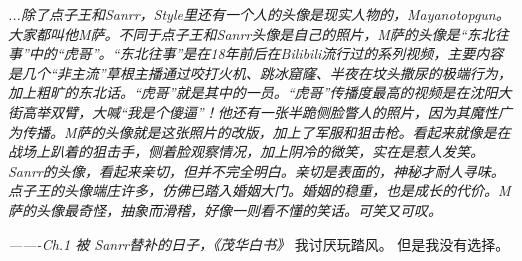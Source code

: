 \documentclass[UTF8]{ctexart}
\begin{document}
\textit{\noindent...除了点子王和Sanrr，Style里还有一个人的头像是现实人物的，Mayanotopgun。大家都叫他M萨。不同于点子王和Sanrr头像是自己的照片，M萨的头像是“东北往事”中的“虎哥”。“东北往事”是在18年前后在Bilibili流行过的系列视频，主要内容是几个“非主流”草根主播通过咬打火机、跳冰窟窿、半夜在坟头撒尿的极端行为，加上粗旷的东北话。“虎哥”就是其中的一员。“虎哥”传播度最高的视频是在沈阳大街高举双臂，大喊“我是个傻逼”！他还有一张半跪侧脸瞥人的照片，因为其魔性广为传播。M萨的头像就是这张照片的改版，加上了军服和狙击枪。看起来就像是在战场上趴着的狙击手，侧着脸观察情况，加上阴冷的微笑，实在是惹人发笑。Sanrr的头像，看起来亲切，但并不完全明白。亲切是表面的，神秘才耐人寻味。点子王的头像端庄许多，仿佛已踏入婚姻大门。婚姻的稳重，也是成长的代价。M萨的头像最奇怪，抽象而滑稽，好像一则看不懂的笑话。可笑又可叹。}
\begin{flushright}
\textit{-------Ch.1 被 Sanrr替补的日子，《茂华白书》}
    我讨厌玩踏风。
    但是我没有选择。
\end{flushright}
\end{document}
